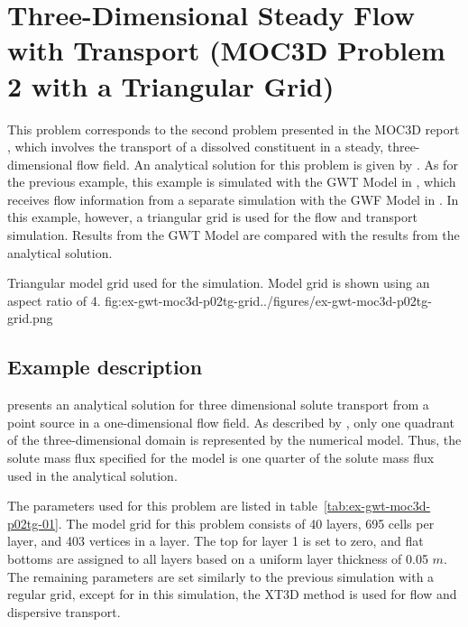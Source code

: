 \section{Three-Dimensional Steady Flow with Transport (MOC3D Problem 2 with a Triangular Grid)}

This problem corresponds to the second problem presented in the MOC3D report \cite{konikow1996three}, which involves the transport of a dissolved constituent in a steady, three-dimensional flow field.  An analytical solution for this problem is given by \cite{wexler1992}.  As for the previous example, this example is simulated with the GWT Model in \mf, which receives flow information from a separate simulation with the GWF Model in \mf.  In this example, however, a triangular grid is used for the flow and transport simulation.  Results from the GWT Model are compared with the results from the \cite{wexler1992} analytical solution.

\begin{StandardFigure}{
                                     Triangular model grid used for the \mf simulation.  Model grid is shown using an aspect ratio of 4.
                                     }{fig:ex-gwt-moc3d-p02tg-grid}{../figures/ex-gwt-moc3d-p02tg-grid.png}
\end{StandardFigure}            


\subsection{Example description}

\cite{wexler1992} presents an analytical solution for three dimensional solute transport from a point source in a one-dimensional flow field.  As described by \cite{konikow1996three}, only one quadrant of the three-dimensional domain is represented by the numerical model.  Thus, the solute mass flux specified for the model is one quarter of the solute mass flux used in the analytical solution.  

The parameters used for this problem are listed in table~\ref{tab:ex-gwt-moc3d-p02tg-01}.  The model grid for this problem consists of 40 layers, 695 cells per layer, and 403 vertices in a layer.  The top for layer 1 is set to zero, and flat bottoms are assigned to all layers based on a uniform layer thickness of 0.05 $m$.  The remaining parameters are set similarly to the previous simulation with a regular grid, except for in this simulation, the XT3D method is used for flow and dispersive transport.

